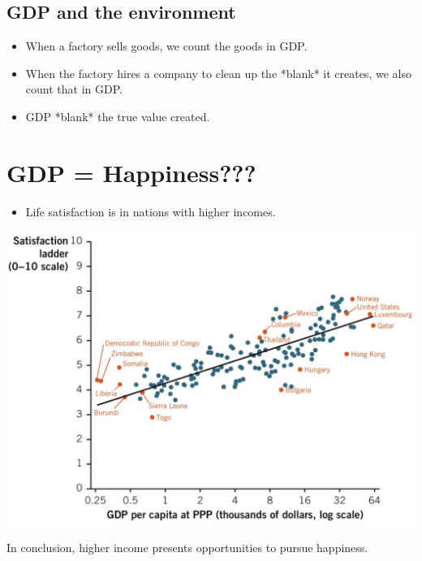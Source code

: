 \documentclass[12pt]{article} %
\begin{document}
\subsection{GDP and the environment}
\begin{itemize}
\item When a factory sells goods, we count the goods in GDP.
\item When the factory hires a company to clean up the *blank* it creates, we also count that in GDP.
\item GDP *blank* the true value created.
\end{itemize}
\section{GDP = Happiness???}
\begin{itemize}
\item Life satisfaction is in nations with higher incomes.
\end{itemize}
\begin{center}
\includegraphics[scale=0.25]{../images/Picture15.jpg}
\end{center} 
In conclusion, higher income presents opportunities to pursue happiness.
\end{document}

